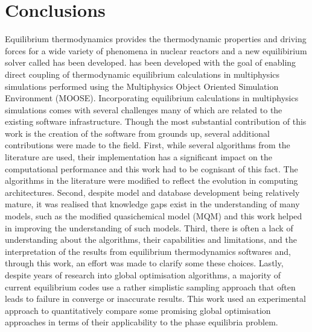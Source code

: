 \chapter{Conclusions} \label{chap:conclusions}

	Equilibrium thermodynamics provides the thermodynamic properties and driving forces for a wide variety of phenomena in nuclear reactors and a new equilibirium solver called {\GEM} has been developed. {\GEM} has been developed with the goal of enabling direct coupling of thermodynamic equilibrium calculations in multiphysics simulations performed using the Multiphysics Object Oriented Simulation Environment (MOOSE). Incorporating equilibrium calculations in multiphysics simulations comes with several challenges many of which are related to the existing software infrastructure. Though the most substantial contribution of this work is the creation of the software from grounds up, several additional contributions were made to the field. First, while several algorithms from the literature are used, their implementation has a significant impact on the computational performance and this work had to be cognisant of this fact. The algorithms in the literature were modified to reflect the evolution in computing architectures. Second, despite model and database development being relatively mature, it was realised that knowledge gaps exist in the understanding of many models, such as the modified quasichemical model (MQM) and this work helped in improving the understanding of such models. Third, there is often a lack of understanding about the algorithms, their capabilities and limitations, and the interpretation of the results from equilibrium thermodynamics softwares and, through this work, an effort was made to clarify some these choices. Lastly, despite years of research into global optimisation algorithms, a majority of current equilibrium codes use a rather simplistic sampling approach that often leads to failure in converge or inaccurate results. This work used an experimental approach to quantitatively compare some promising global optimisation approaches in terms of their applicability to the phase equilibria problem. 

